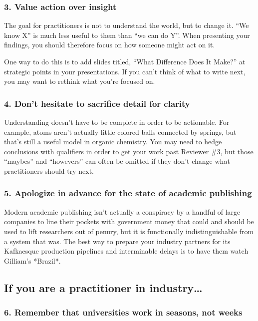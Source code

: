 \documentclass[10pt,letterpaper]{article}
\begin{document}
\subsubsection*{3. Value action over insight}

The goal for practitioners is not to understand the world, but to change it. ``We
know X'' is much less useful to them than ``we can do Y''. When presenting your
findings, you should therefore focus on how someone might act on it.

One way to do this is to add slides titled, ``What Difference Does It Make?'' at
strategic points in your presentations. If you can't think of what to write
next, you may want to rethink what you're focused on.

\subsubsection*{4. Don't hesitate to sacrifice detail for clarity}

Understanding doesn't have to be complete in order to be actionable. For
example, atoms aren't actually little colored balls connected by springs, but
that's still a useful model in organic chemistry. You may need to hedge
conclusions with qualifiers in order to get your work past Reviewer \#3, but
those ``maybes'' and ``howevers'' can often be omitted if they don't change what
practitioners should try next.

\subsubsection*{5. Apologize in advance for the state of academic publishing}

Modern academic publishing isn't actually a conspiracy by a handful of large
companies to line their pockets with government money that could and should be
used to lift researchers out of penury, but it is functionally indistinguishable
from a system that was. The best way to prepare your industry partners for its
Kafkaesque production pipelines and interminable delays is to have them watch
Gilliam's *Brazil*.

\subsection*{If you are a practitioner in industry{\ldots}}

\subsubsection*{6. Remember that universities work in seasons, not weeks}
\end{document}
